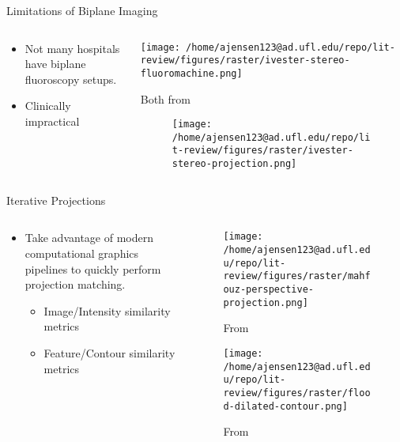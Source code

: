 \documentclass[presentation, aspectratio=1610]{beamer}
\begin{document}
\begin{frame}[label={sec:orgfe4555e}]{Limitations of Biplane Imaging}
\begin{columns}
\begin{column}{0.5\columnwidth}
\begin{itemize}
\item Not many hospitals have biplane fluoroscopy setups.
\item Clinically impractical
\end{itemize}
\end{column}
\begin{column}{0.6\columnwidth}
\begin{center}
\texttt{[image: /home/ajensen123@ad.ufl.edu/repo/lit-review/figures/raster/ivester-stereo-fluoromachine.png]}
\caption{Both from \autocite{ivesterReconfigurableHighSpeedStereoRadiography2015}}
\end{center}
\vspace{-0.25in}
\begin{figure}[htbp]
\centering
\texttt{[image: /home/ajensen123@ad.ufl.edu/repo/lit-review/figures/raster/ivester-stereo-projection.png]}
\end{figure}
\end{column}
\end{columns}
\end{frame}
\begin{frame}[label={sec:org476092e}]{Iterative Projections}
\begin{columns}
\begin{column}{0.54\columnwidth}
\begin{itemize}
\item Take advantage of modern computational graphics pipelines to quickly perform projection matching.
\begin{itemize}
\item Image/Intensity similarity metrics \autocite{mahfouzRobustMethodRegistration2003}
\item Feature/Contour similarity metrics \autocite{floodAutomatedRegistration3D2018}
\end{itemize}
\end{itemize}
\end{column}
\begin{column}{0.6\columnwidth}
\begin{figure}[htbp]
\centering
\texttt{[image: /home/ajensen123@ad.ufl.edu/repo/lit-review/figures/raster/mahfouz-perspective-projection.png]}
\caption{From \autocite{mahfouzRobustMethodRegistration2003}}
\end{figure}
\begin{figure}[htbp]
\centering
\texttt{[image: /home/ajensen123@ad.ufl.edu/repo/lit-review/figures/raster/flood-dilated-contour.png]}
\caption{From \autocite{floodAutomatedRegistration3D2018}}
\end{figure}
\end{column}
\end{columns}
\end{frame}
\end{document}
